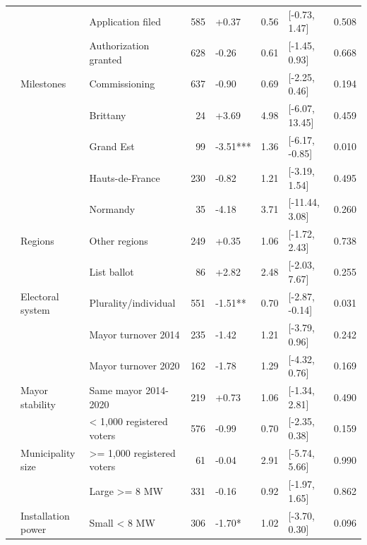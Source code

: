 \begin{ThreePartTable}
\begin{longtable}[t]{lllrllll}
\cmidrule{2-8}\nopagebreak
 &  & Application filed & 585 & +0.37 & 0.56 & {}[-0.73, 1.47] & 0.508\\
\cmidrule{3-8}\nopagebreak
 &  & Authorization granted & 628 & -0.26 & 0.61 & {}[-1.45, 0.93] & 0.668\\
\cmidrule{3-8}\nopagebreak
 & \multirow[t]{-3}{*}{\raggedright\arraybackslash Milestones} & Commissioning & 637 & -0.90 & 0.69 & {}[-2.25, 0.46] & 0.194\\
\cmidrule{2-8}\nopagebreak
 &  & Brittany & 24 & +3.69 & 4.98 & {}[-6.07, 13.45] & 0.459\\
\cmidrule{3-8}\nopagebreak
 &  & Grand Est & 99 & -3.51*** & 1.36 & {}[-6.17, -0.85] & 0.010\\
\cmidrule{3-8}\nopagebreak
 &  & Hauts-de-France & 230 & -0.82 & 1.21 & {}[-3.19, 1.54] & 0.495\\
\cmidrule{3-8}\nopagebreak
 &  & Normandy & 35 & -4.18 & 3.71 & {}[-11.44, 3.08] & 0.260\\
\cmidrule{3-8}\nopagebreak
 & \multirow[t]{-5}{*}{\raggedright\arraybackslash Regions} & Other regions & 249 & +0.35 & 1.06 & {}[-1.72, 2.43] & 0.738\\
\cmidrule{2-8}\nopagebreak
 &  & List ballot & 86 & +2.82 & 2.48 & {}[-2.03, 7.67] & 0.255\\
\cmidrule{3-8}\nopagebreak
 & \multirow[t]{-2}{*}{\raggedright\arraybackslash Electoral system} & Plurality/individual & 551 & -1.51** & 0.70 & {}[-2.87, -0.14] & 0.031\\
\cmidrule{2-8}\nopagebreak
 &  & Mayor turnover 2014 & 235 & -1.42 & 1.21 & {}[-3.79, 0.96] & 0.242\\
\cmidrule{3-8}\nopagebreak
 &  & Mayor turnover 2020 & 162 & -1.78 & 1.29 & {}[-4.32, 0.76] & 0.169\\
\cmidrule{3-8}\nopagebreak
 & \multirow[t]{-3}{*}{\raggedright\arraybackslash Mayor stability} & Same mayor 2014-2020 & 219 & +0.73 & 1.06 & {}[-1.34, 2.81] & 0.490\\
\cmidrule{2-8}\nopagebreak
 &  & < 1,000 registered voters & 576 & -0.99 & 0.70 & {}[-2.35, 0.38] & 0.159\\
\cmidrule{3-8}\nopagebreak
 & \multirow[t]{-2}{*}{\raggedright\arraybackslash Municipality size} & >= 1,000 registered voters & 61 & -0.04 & 2.91 & {}[-5.74, 5.66] & 0.990\\
\cmidrule{2-8}\nopagebreak
 &  & Large >= 8 MW & 331 & -0.16 & 0.92 & {}[-1.97, 1.65] & 0.862\\
\cmidrule{3-8}\nopagebreak
 & \multirow[t]{-2}{*}{\raggedright\arraybackslash Installation power} & Small < 8 MW & 306 & -1.70* & 1.02 & {}[-3.70, 0.30] & 0.096\\

\end{longtable}
\end{ThreePartTable}
